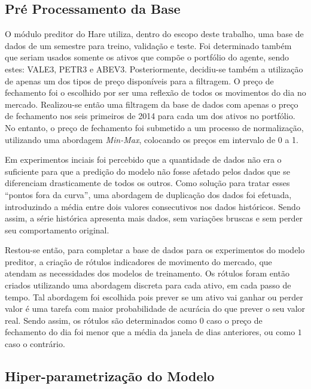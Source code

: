\subsection{Pré Processamento da Base}

O módulo preditor do Hare utiliza, dentro do escopo deste trabalho, uma base de dados de um semestre para treino, validação e teste. Foi determinado também que seriam usados somente os ativos que compõe o portfólio do agente, sendo estes: VALE3, PETR3 e ABEV3. Posteriormente, decidiu-se também a utilização de apenas um dos tipos de preço disponíveis para a filtragem. O preço de fechamento foi o escolhido por ser uma reflexão de todos os movimentos do dia no mercado. Realizou-se então uma filtragem da base de dados com apenas o preço de fechamento nos seis primeiros de 2014 para cada um dos ativos no portfólio. No entanto, o preço de fechamento foi submetido a um processo de normalização, utilizando uma abordagem \textit{Min-Max}, colocando os preços em intervalo de 0 a 1. 

Em experimentos inciais foi percebido que a quantidade de dados não era o suficiente para que a predição do modelo não fosse afetado pelos dados que se diferenciam drasticamente de todos os outros. Como solução para tratar esses ``pontos fora da curva'', uma abordagem de duplicação dos dados foi efetuada, introduzindo a média entre dois valores consecutivos nos dados históricos. Sendo assim, a série histórica apresenta mais dados, sem variações bruscas e sem perder seu comportamento original. 

Restou-se então, para completar a base de dados para os experimentos do modelo preditor, a criação de rótulos indicadores de movimento do mercado, que atendam as necessidades dos modelos de treinamento. Os rótulos foram então criados utilizando uma abordagem discreta para cada ativo, em cada passo de tempo. Tal abordagem foi escolhida pois prever se um ativo vai ganhar ou perder valor é uma tarefa com maior probabilidade de acurácia do que prever o seu valor real. Sendo assim, os rótulos são determinados como $0$ caso o preço de fechamento do dia foi menor que a média da janela de dias anteriores, ou como $1$ caso o contrário. 

\subsection{Hiper-parametrização do Modelo}
\label{exp:hyper}

% 

